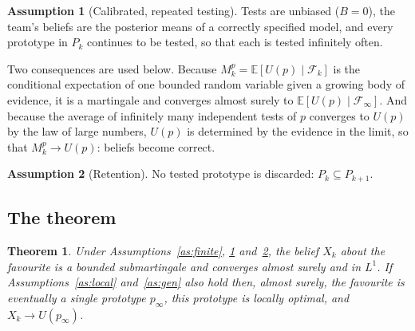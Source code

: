 \documentclass[10pt,twocolumn]{article}
\newcommand{\E}{\mathbb{E}}
\newcommand{\filt}{\mathcal{F}}
\newcommand{\Pk}{P_k}
\newtheorem{theorem}{Theorem}
\theoremstyle{definition}
\newtheorem{assumption}{Assumption}
\begin{document}
\begin{assumption}[Calibrated, repeated testing]
\label{as:test}
Tests are unbiased ($B=0$), the team's beliefs are the posterior means of a correctly specified model, and every prototype in $\Pk$ continues to be tested, so that each is tested infinitely often.
\end{assumption}

Two consequences are used below. Because $M^p_k=\E[U(p)\mid\filt_k]$ is the conditional expectation of one bounded random variable given a growing body of evidence, it is a martingale and converges almost surely to $\E[U(p)\mid\filt_\infty]$. And because the average of infinitely many independent tests of $p$ converges to $U(p)$ by the law of large numbers, $U(p)$ is determined by the evidence in the limit, so that $M^p_k\to U(p)$: beliefs become correct.

\begin{assumption}[Retention]
\label{as:retention}
No tested prototype is discarded: $\Pk\subseteq P_{k+1}$.
\end{assumption}

\subsection{The theorem}

\begin{theorem}
\label{thm:converge}
Under Assumptions~\ref{as:finite}, \ref{as:test} and~\ref{as:retention}, the belief $X_k$ about the favourite is a bounded submartingale and converges almost surely and in $L^1$. If Assumptions~\ref{as:local} and~\ref{as:gen} also hold then, almost surely, the favourite is eventually a single prototype $p_\infty$, this prototype is locally optimal, and $X_k\to U(p_\infty)$.
\end{theorem}
\end{document}
